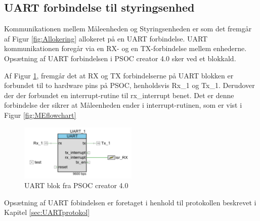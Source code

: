 
\subsection{UART forbindelse til styringsenhed}

Kommunikationen mellem Måleenheden og Styringsenheden er som det fremgår af Figur \ref{fig:Allokering} allokeret på en UART forbindelse. UART kommunikationen foregår via en RX- og en TX-forbindelse mellem enhederne. Opsætning af UART forbindelsen i PSOC creator 4.0 sker ved et blokkald. 

Af Figur \ref{fig:MEUART}, fremgår det at RX og TX forbindelserne på UART blokken er forbundet til to hardware pins på PSOC, henholdsvis Rx\_1 og Tx\_1. Derudover der der forbundet en interrupt-rutine til rx\_interrupt benet. Det er denne forbindelse der sikrer at Måleenheden ender i interrupt-rutinen, som er vist i Figur \ref{fig:MEflowchart}
\begin{figure}[H] %
	\centering
	\includegraphics[width=0.5\textwidth]{Figure/MEUART}
	\caption{UART blok fra PSOC creator 4.0}
	\label{fig:MEUART}
\end{figure}

Opsætning af UART fobindelsen er foretaget i henhold til protokollen beskrevet i Kapitel \ref{sec:UARTprotokol}